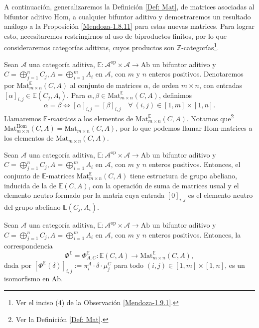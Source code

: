 \documentclass[tesis]{subfiles}
\begin{document}
A continuación, generalizaremos la Definición \ref{Def: Mat}, de matrices asociadas al bifuntor aditivo Hom, a cualquier bifuntor aditivo y demostraremos un resultado análogo a la Proposición \ref{Mendoza-1.8.11} para estas nuevas matrices. Para lograr esto, necesitaremos restringirnos al uso de biproductos finitos, por lo que consideraremos categorías aditivas, cuyos productos son $\mathbb{Z}$-categorías\footnote{Ver el inciso (4) de la Observación \ref{Mendoza-1.9.1}.}. 

\begin{Def}\label{Def: E-matrices}
    Sean $\mathscr{A}$ una categoría aditiva, $\mathbb{E}:\mathscr{A}^\text{op}\times\mathscr{A}\to \text{Ab}$ un bifuntor aditivo y $C=\bigoplus_{j=1}^n C_j, A=\bigoplus_{i=1}^m A_i$ en $\mathscr{A}$, con $m$ y $n$ enteros positivos. Denotaremos por $\text{Mat}^\mathbb{E}_{m\times n}(C,A)$ al conjunto de matrices $\alpha$, de orden $m\times n$, con entradas $[\alpha]_{i,j}\in\mathbb{E}(C_j,A_i)$. Para $\alpha,\beta\in\text{Mat}^\mathbb{E}_{m\times n}(C,A)$, definimos
\[
    \alpha = \beta \iff [\alpha]_{i,j} = [\beta]_{i,j} \quad \forall \ (i,j)\in [1,m]\times[1,n].
\] 
Llamaremos \emph{$\mathbb{E}$-matrices} a los elementos de $\text{Mat}^\mathbb{E}_{m\times n}(C,A)$. Notamos que\footnote{Ver la Definición \ref{Def: Mat}.} $\text{Mat}^\text{Hom}_{m\times n}(C,A) = \text{Mat}_{m\times n}(C,A)$, por lo que podemos llamar Hom-matrices a los elementos de $\text{Mat}_{m\times n}(C,A)$.
\end{Def}

\begin{Obs}\label{Obs: E-matrices}
    Sean $\mathscr{A}$ una categoría aditiva, $\mathbb{E}:\mathscr{A}^\text{op}\times\mathscr{A}\to \text{Ab}$ un bifuntor aditivo y $C=\bigoplus_{j=1}^n C_j, A=\bigoplus_{i=1}^m A_i$ en $\mathscr{A}$, con $m$ y $n$ enteros positivos. Entonces, el conjunto de $\mathbb{E}$-matrices $\text{Mat}^\mathbb{E}_{m\times n}(C,A)$ tiene estructura de grupo abeliano, inducida de la de $\mathbb{E}(C,A)$, con la operación de suma de matrices usual y el elemento neutro formado por la matriz cuya entrada $[0]_{i,j}$ es el elemento neutro del grupo abeliano $\mathbb{E}(C_j,A_i)$.
\end{Obs}

\begin{Prop}\label{Mendoza-1.8.11g}
    Sean $\mathscr{A}$ una categoría aditiva, $\mathbb{E}:\mathscr{A}^\text{op}\times\mathscr{A}\to   \text{Ab}$ un bifuntor aditivo y $C=\bigoplus_{j=1}^n C_j, A=\bigoplus_{i=1}^m A_i$ en $\mathscr{A}$, con $m$ y $n$ enteros positivos. Entonces, la correspondencia
    \[
        \Phi^\mathbb{E} = \Phi^\mathbb{E}_{A,C}:\mathbb{E}(C,A) \to \text{Mat}^\mathbb{E}_{m\times n}(C,A),
    \]
    dada por $[\Phi^\mathbb{E}(\delta)]_{i,j} := \pi_i^A\cdot \delta\cdot\mu_j^C$ para todo $(i,j)\in [1,m]\times[1,n]$, es un isomorfismo en Ab.
\end{Prop}
\end{document}

